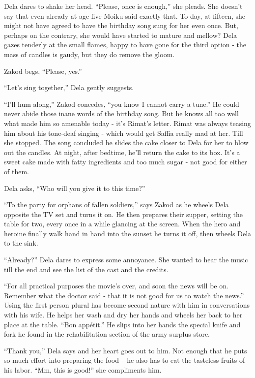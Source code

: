 \documentclass[twoside,11pt]{book}
\begin{document}
Dela dares to shake her head. ``Please, once is enough,'' she pleads. She doesn't say that
even already at age five Moiku said exactly that. To-day, at fifteen, she might not have agreed to have the birthday
song sung for her even once. But, perhaps on the contrary, she would have started to mature and mellow? Dela gazes
tenderly at the small flames, happy to have gone for the third option - the mass of candles is gaudy, but they do
remove the gloom.

Zakod begs, ``Please, yes.''

``Let's sing together,'' Dela gently suggests.

``I'll hum along,'' Zakod concedes, ``you know I cannot carry a
tune.'' He could never abide those inane words of the birthday song. But he knows all too well what made
him so amenable today - it's Rimat's letter. Rimat was always teasing him about his tone-deaf singing - which would get
Saffia really mad at her. Till she stopped. The song concluded he slides the cake closer to Dela for her to blow out
the candles. At night, after bedtime, he'll return the cake to its box. It's a sweet cake made with fatty ingredients
and too much sugar - not good for either of them.

Dela asks, ``Who will you give it to this time?''

``To the party for orphans of fallen soldiers,'' says Zakod as he wheels Dela opposite the TV
set and turns it on. He then prepares their supper, setting the table for two, every once in a while glancing at the
screen. When the hero and heroine finally walk hand in hand into the sunset he turns it off, then wheels Dela to the
sink.

``Already?'' Dela dares to express some annoyance. She wanted to hear the music till the end
and see the list of the cast and the credits.

``For all practical purposes the movie's over, and soon the news will be on. Remember what the doctor said
- that it is not good for us to watch the news.'' Using the first person plural has become second nature
with him in conversations with his wife. He helps her wash and dry her hands and wheels her back to her place at the
table. ``Bon app\'etit.'' He slips into her hands the special knife and fork he found in the
rehabilitation section of the army surplus store.

``Thank you,'' Dela says and her heart goes out to him. Not enough that he puts so much
effort into preparing the food -- he also has to eat the tasteless fruits of his labor. ``Mm, this is
good!'' she compliments him.
\end{document}
